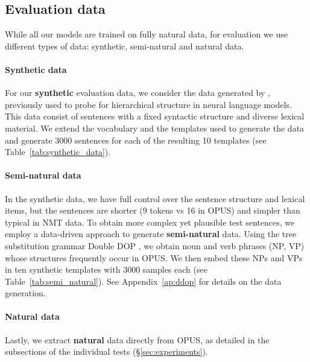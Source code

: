 \subsection{Evaluation data}\label{sec:data}

While all our models are trained on fully natural data, for evaluation we use different types of data: synthetic, semi-natural and natural data.

\paragraph{Synthetic data}
For our \textbf{synthetic} evaluation data, we consider the data generated by \citet{lakretz2019emergence},
previously used to probe for hierarchical structure in neural language models.
This data consist of sentences with a fixed syntactic structure and diverse lexical material.
We extend the vocabulary and the templates used to generate the data and generate 3000 sentences for each of the resulting 10 templates (see Table~\ref{tab:synthetic_data}).

\paragraph{Semi-natural data}
In the synthetic data, we have full control over the sentence structure and lexical items, but the sentences are shorter (9 tokens vs 16 in \textsc{OPUS}) and simpler than typical in NMT data.
To obtain more complex yet plausible test sentences, we employ a data-driven approach to generate \textbf{semi-natural} data. 
Using the tree substitution grammar Double DOP \citep{vancranenburgh2016disc}, we obtain noun and verb phrases (NP, VP) whose structures frequently occur in \textsc{OPUS}.
We then embed these NPs and VPs in ten synthetic templates with 3000 samples each (see Table~\ref{tab:semi_natural}).
See Appendix~\ref{ap:ddop} for details on the data generation.

\paragraph{Natural data}
Lastly, we extract \textbf{natural} data directly from \textsc{OPUS}, as detailed in the subsections of the individual tests (\S\ref{sec:experiments}).
